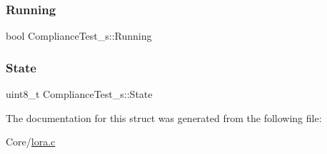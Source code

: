 \subsubsection{\texorpdfstring{Running}{Running}}
{\footnotesize\ttfamily bool Compliance\+Test\+\_\+s\+::\+Running}

\mbox{\label{structComplianceTest__s_a09f13d5e6c7f74b686f798421631942f}} 
\subsubsection{\texorpdfstring{State}{State}}
{\footnotesize\ttfamily uint8\+\_\+t Compliance\+Test\+\_\+s\+::\+State}



The documentation for this struct was generated from the following file\+:\begin{DoxyCompactItemize}
\item 
Core/\hyperlink{lora_8c}{lora.\+c}\end{DoxyCompactItemize}
